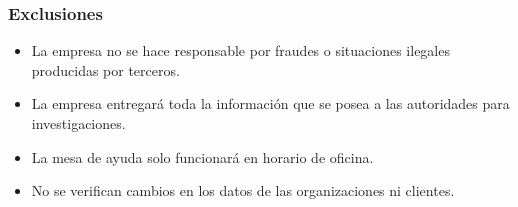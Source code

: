 \documentclass[letterpaper,openright,10pt,oneside]{report}
\begin{document}
						\subsubsection{Exclusiones}
							\begin{itemize}
								\item La empresa no se hace responsable por fraudes o situaciones ilegales producidas por terceros.
								\item La empresa entregará toda la información que se posea a las autoridades para investigaciones.
								\item La mesa de ayuda solo funcionará en horario de oficina.
								\item No se verifican cambios en los datos de las organizaciones ni clientes.
							\end{itemize}
			
\end{document}
